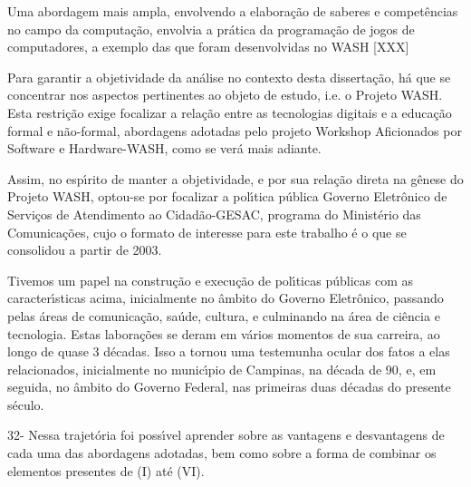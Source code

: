 \documentclass[
12pt,		%
openright,	%
twoside,  %
a4paper,			%
chapter=TITLE,		%
english,			%
french,				%
spanish,			%
brazil				%
]{USPSC-classe/USPSC_RedarTex}
\begin{document}
Uma abordagem mais ampla, envolvendo a elabora\c{c}\~ao de saberes e compet\^encias no campo da computa\c{c}\~ao, envolvia a pr\'atica da programa\c{c}\~ao de jogos de computadores, a exemplo das que foram desenvolvidas no WASH [XXX]








Para garantir a objetividade da an\'alise no contexto desta disserta\c{c}\~ao, h\'a que se concentrar nos aspectos pertinentes ao objeto de estudo, i.e. o Projeto WASH. Esta restri\c{c}\~ao exige focalizar a rela\c{c}\~ao entre as tecnologias digitais e a educa\c{c}\~ao formal e n\~ao-formal, abordagens adotadas pelo projeto Workshop Aficionados por Software e Hardware-WASH, como se ver\'a mais adiante.








Assim, no esp\'{\i}rito de manter a objetividade, e por sua rela\c{c}\~ao direta na g\^enese do Projeto WASH, optou-se por focalizar a pol\'{\i}tica p\'ublica \textquotedbl Governo Eletr\^onico de Servi\c{c}os de Atendimento ao Cidad\~ao-GESAC, programa do  Minist\'erio das Comunica\c{c}\~oes, cujo o formato de interesse para este trabalho \'e o que se consolidou a partir de 2003.








Tivemos um papel na constru\c{c}\~ao e execu\c{c}\~ao de pol\'{\i}ticas p\'ublicas com as caracter\'{\i}sticas acima, inicialmente no \^ambito do Governo Eletr\^onico, passando pelas \'areas de comunica\c{c}\~ao, sa\'ude, cultura, e culminando na \'area de ci\^encia e tecnologia. Estas labora\c{c}\~oes  se deram em v\'arios momentos de sua carreira, ao longo de quase 3 d\'ecadas. Isso a tornou uma testemunha ocular dos fatos a elas relacionados, inicialmente no  munic\'{\i}pio de Campinas, na d\'ecada de 90, e, em seguida, no \^ambito do Governo Federal, nas primeiras duas d\'ecadas do presente s\'eculo.








32- Nessa trajet\'oria foi poss\'{\i}vel aprender sobre as vantagens e desvantagens de cada uma das abordagens adotadas, bem como sobre a forma de combinar os elementos presentes de (I) at\'e (VI).
\end{document}
